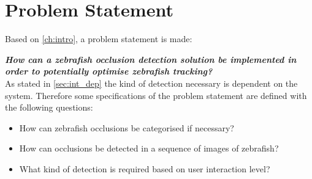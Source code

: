 \chapter{Problem Statement}\label{ch:prob_state}
Based on \autoref{ch:intro}, a problem statement is made:

\textbf{\textit{How can a zebrafish occlusion detection solution be implemented in order to potentially optimise zebrafish tracking?}}\\

As stated in \autoref{sec:int_dep} the kind of detection necessary is dependent on the system. Therefore some specifications of the problem statement are defined with the following questions:
\begin{itemize}
	\item How can zebrafish occlusions be categorised if necessary?
	\item How can occlusions be detected in a sequence of images of zebrafish? %
	\item What kind of detection is required based on user interaction level?
\end{itemize}


